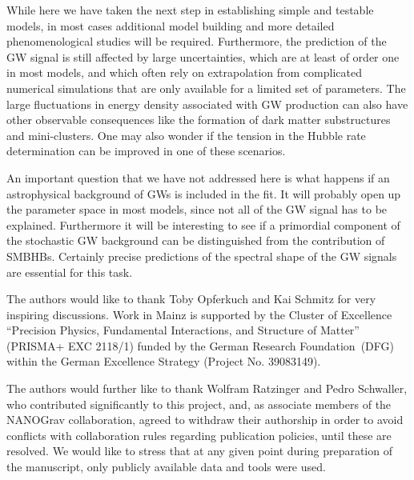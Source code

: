 \documentclass{article}
\begin{document}
While here we have taken the next step in establishing simple and testable models, in most cases additional model building and more detailed phenomenological studies will be required. Furthermore, the prediction of the GW signal is still affected by large uncertainties, which are at least of order one in most models, and which often rely on extrapolation from complicated numerical simulations that are only available for a limited set of parameters. The large fluctuations in energy density associated with GW production can also have other observable consequences like the formation of dark matter substructures and mini-clusters. One may also wonder if the tension in the Hubble rate determination can be improved in one of these scenarios. 

An important question that we have not addressed here is what happens if an astrophysical background of GWs is included in the fit. It will probably open up the parameter space in most models, since not all of the GW signal has to be explained. Furthermore it will be interesting to see if a primordial component of the stochastic GW background can be distinguished from the contribution of SMBHBs. Certainly precise predictions of the spectral shape of the GW signals are essential for this task. 


\acknowledgments

The authors would like to thank Toby Opferkuch and Kai Schmitz for very inspiring discussions. 
Work in Mainz is supported by the Cluster of Excellence “Precision Physics, Fundamental Interactions, and Structure of Matter” (PRISMA+ EXC 2118/1) funded by the German Research Foundation~(DFG) within the German Excellence Strategy (Project No. 39083149).

The authors would further like to thank Wolfram Ratzinger and Pedro Schwaller, who contributed significantly to this project, and, as associate members of the NANOGrav collaboration, agreed to withdraw their authorship in order to avoid conflicts with collaboration rules regarding publication policies, until these are resolved.
We would like to stress that at any given point during preparation of the manuscript, only publicly available data and tools were used.


\appendix

\end{document}
